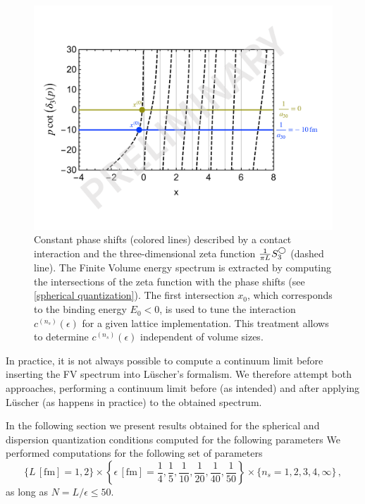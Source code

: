 \begin{figure}
\center
\includegraphics[width=.7\textwidth]{figure/tuning.pdf}
\caption{\label{fig:tuning}
    Constant phase shifts (colored lines) described by a contact interaction and the three-dimensional zeta function $\frac{1}{\pi L} S^{\bigcirc}_3$ (dashed line).
    The Finite Volume energy spectrum is extracted by computing the intersections of the zeta function with the phase shifts (see \eqref{spherical quantization}).
    The first intersection $x_0$, which corresponds to the binding energy $E_0 < 0$, is used to tune the interaction $c^{(n_s)}(\epsilon)$ for a given lattice implementation.
    This treatment allows to determine $c^{(n_s)}(\epsilon)$ independent of volume sizes.
}
\end{figure}

In practice, it is not always possible to compute a continuum limit before inserting the FV spectrum into Lüscher's formalism.
We therefore attempt both approaches, performing a continuum limit before (as intended) and after applying Lüscher (as happens in practice) to the obtained spectrum.

In the following section we present results obtained for the spherical and dispersion quantization conditions computed for the following parameters
We performed computations for the following set of parameters
\begin{equation}
    \{ L \,[\mathrm{fm}]= 1, 2 \}
    \times \left\{ \epsilon \,[\mathrm{fm}] = \frac{1}{4}, \frac{1}{5}, \frac{1}{10}, \frac{1}{20}, \frac{1}{40}, \frac{1}{50} \right\}
    \times \{ n_s = 1, 2, 3, 4, \infty \}
    \, ,
\end{equation}
as long as $N = L / \epsilon \leq 50$.




